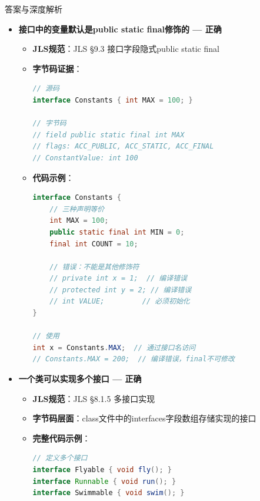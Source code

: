 \documentclass[12pt, a4paper]{ctexart}
\begin{document}
\begin{enumerate}[label=\textbf{\arabic*.}]
\begin{bluebox}{答案与深度解析}
\begin{itemize}[leftmargin=*, nosep, label={}]
\begin{itemize}[label={}, leftmargin=*, nosep]
\begin{lstlisting}[language=Java]
    // default和static方法例外（Java 8+）
    default void defaultMethod() {
        System.out.println("默认实现");
    }
    static void staticMethod() {
        System.out.println("静态方法");
    }
}
// 普通接口方法默认public abstract
					      \end{lstlisting}
			            \end{itemize}

			      \item[B] \textbf{接口中的变量默认是public static final修饰的 — 正确}
			            \begin{itemize}[label={}, leftmargin=*, nosep]
				            \item \textbf{JLS规范}：JLS §9.3 接口字段隐式public static final
				            \item \textbf{字节码证据}：
				                  \begin{lstlisting}[language=Java]
// 源码
interface Constants { int MAX = 100; }

// 字节码
// field public static final int MAX
// flags: ACC_PUBLIC, ACC_STATIC, ACC_FINAL
// ConstantValue: int 100
						      \end{lstlisting}
				            \item \textbf{代码示例}：
				                  \begin{lstlisting}[language=Java]
interface Constants {
    // 三种声明等价
    int MAX = 100;
    public static final int MIN = 0;
    final int COUNT = 10;

    // 错误：不能是其他修饰符
    // private int x = 1;  // 编译错误
    // protected int y = 2; // 编译错误
    // int VALUE;         // 必须初始化
}

// 使用
int x = Constants.MAX;  // 通过接口名访问
// Constants.MAX = 200;  // 编译错误，final不可修改
					      \end{lstlisting}
			            \end{itemize}

			      \item[C] \textbf{一个类可以实现多个接口 — 正确}
			            \begin{itemize}[label={}, leftmargin=*, nosep]
				            \item \textbf{JLS规范}：JLS §8.1.5 多接口实现
				            \item \textbf{字节码层面}：class文件中的interfaces字段数组存储实现的接口
				            \item \textbf{完整代码示例}：
				                  \begin{lstlisting}[language=Java]
// 定义多个接口
interface Flyable { void fly(); }
interface Runnable { void run(); }
interface Swimmable { void swim(); }


\end{lstlisting}
\end{itemize}
\end{itemize}
\end{bluebox}
\end{enumerate}
\end{document}
